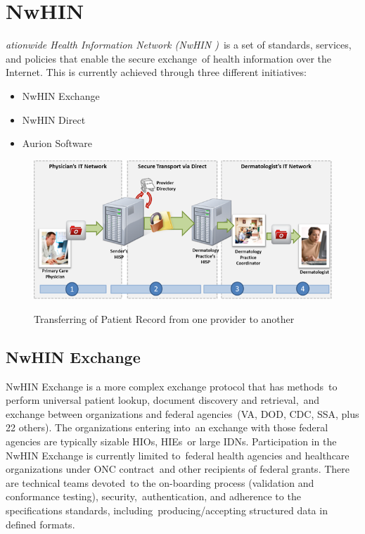   \section[Nationwide Health Information Network (NwHIN)]{NwHIN}
  \label{sec:nwhin}

  \textit{ationwide Health Information Network (NwHIN )}\
  is a set of standards, services, and policies that enable the secure exchange\
  of health information over the Internet.\citep{_nwhin_framework_2013}
 This is currently achieved through three different initiatives:\
  \begin{itemize}
    \itemsep0ex
    \item  NwHIN Exchange
    \item  NwHIN Direct 
    \item Aurion Software
  \end{itemize}

\begin{figure}[ht!]
    \centering
    \includegraphics[scale=0.5]{nwhin.png}
    \caption{Transferring of Patient Record from one provider to another}
    \cite[Fig.~1]{_nwhin_frameworkOne_2013}
    \label{fig:nwhin}
  \end{figure}  

  \subsection{NwHIN Exchange}

 	NwHIN Exchange is a more complex exchange protocol that has methods\
to perform universal patient lookup, document discovery and retrieval,\
 and exchange between organizations and federal agencies\
 (VA, DOD, CDC, SSA, plus 22 others). The organizations entering into\
 an exchange with those federal agencies are typically sizable HIOs, HIEs\
or large IDNs. Participation in the NwHIN Exchange is currently limited to\
federal health agencies and healthcare organizations under ONC contract\
 and other recipients of federal grants. There are technical teams devoted\
 to the on-boarding process (validation and conformance testing), security,\
 authentication, and adherence to the specifications standards, including\
 producing/accepting structured data in defined formats.\
\citep{_nwhin_exchange_2013}\

